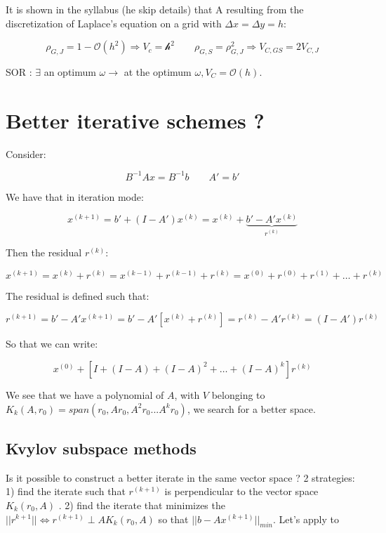 \begin{itemize}
It is shown in the syllabus (he skip details) that A resulting from the discretization of Laplace's equation on a grid with $\Delta x= \Delta y = h$: 

\begin{equation}
\rho _{G,J} = 1-\mathcal{O}(h^2) \Rightarrow V_c = \mathcal{h^2} \qquad \rho _{G,S} = \rho _{G,J}^2 \Rightarrow V_{C,GS} = 2V_{C,J}
\end{equation}

SOR : $\exists$ an optimum $\omega \rightarrow $ at the optimum $\omega, V_C = \mathcal{O}(h)$. 
\end{itemize}
\section{Better iterative schemes ? }
Consider: 

\begin{equation}
B^{-1}A x = B^{-1}b \qquad A' = b'
\end{equation} 

We have that in iteration mode: 

\begin{equation}
x^{(k+1)} = b' + (I-A')x^{(k)} = x^{(k)} + \underbrace{b' - A' x^{(k)}}_{r^{(k)}}
\end{equation}

Then the residual $r^{(k)}$: 

\begin{equation}
x^{(k+1)} = x^{(k)} + r^{(k)} = x^{(k-1)} + r^{(k-1) } + r^{(k) } = x^{(0)} + r^{(0) } + r^{(1) } + \dots + r^{(k) }
\end{equation}

The residual is defined such that: 

\begin{equation}
r^{(k+1)} = b' - A' x^{(k+1)} = b' - A' [x^{(k)}+r^{(k)}] = r^{(k)} - A' r^{(k)} = (I-A')r^{(k)} 
\end{equation}

So that we can write: 

\begin{equation}
x^{(0)} + [I + (I-A)+ (I-A)^2+ \dots + (I-A)^k] r^{(k)}
\end{equation}

We see that we have a polynomial of $A$, with $V$ belonging to $K_k (A,r_0) = span (r_0,Ar_0,A^2r_0 ... A^k r_0)$, we search for a better space. 

\subsection{Kvylov subspace methods}
Is it possible to construct a better iterate in the same vector space ? 2 strategies: 1) find the iterate such that $r^{(k+1)}$ is perpendicular to the vector space $K_k(r_0,A)$ . 2) find the iterate that minimizes the $||r^{k+1}|| \Leftrightarrow r^{(k+1)}\perp AK_k (r_0,A)$ so that $||b-Ax^{(k+1)}||_{min}$. Let's apply to 

